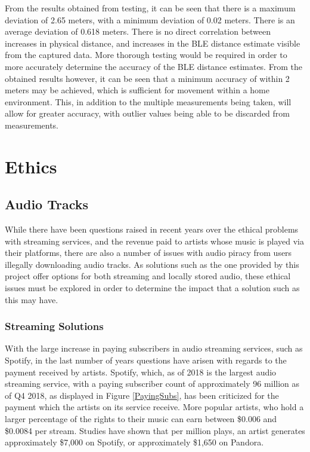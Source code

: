 \documentclass[11pt,a4paper,headinclude=false,footinclude=false]{scrreprt}
\begin{document}
From the results obtained from testing, it can be seen that there is a
maximum deviation of 2.65 meters, with a minimum deviation of 0.02
meters. There is an average deviation of 0.618 meters. There is no
direct correlation between increases in physical distance, and increases
in the BLE distance estimate visible from the captured data. More
thorough testing would be required in order to more accurately determine
the accuracy of the BLE distance estimates. From the obtained results
however, it can be seen that a minimum accuracy of within 2 meters may
be achieved, which is sufficient for movement within a home environment.
This, in addition to the multiple measurements being taken, will allow
for greater accuracy, with outlier values being able to be discarded
from measurements.

\chapter{Ethics}\label{ethics}

\section{Audio Tracks}\label{audio-tracks}

While there have been questions raised in recent years over the ethical
problems with streaming services, and the revenue paid to artists whose
music is played via their platforms, there are also a number of issues
with audio piracy from users illegally downloading audio tracks. As
solutions such as the one provided by this project offer options for
both streaming and locally stored audio, these ethical issues must be
explored in order to determine the impact that a solution such as this
may have.

\subsection{Streaming Solutions}\label{streaming-solutions}

With the large increase in paying subscribers in audio streaming
services, such as Spotify, in the last number of years questions have
arisen with regards to the payment received by artists. Spotify, which,
as of 2018\cite{SpotPay18} is the largest audio streaming service, with
a paying subscriber count of approximately 96 million as of Q4
2018\cite{SpotSubs18}, as displayed in Figure \ref{PayingSubs}, has been
criticized for the payment which the artists on its service receive.
More popular artists, who hold a larger percentage of the rights to
their music can earn between \$0.006 and \$0.0084 per stream. Studies
have shown that per million plays, an artist generates approximately
\$7,000 on Spotify, or approximately \$1,650 on
Pandora\cite{CNBCSpot18}.
\end{document}

